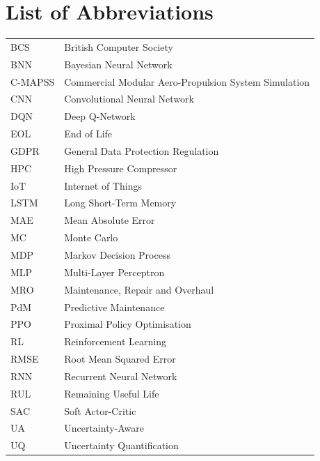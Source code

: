 \documentclass[12pt,a4paper]{report}
\begin{document}
\newpage

\tableofcontents
\newpage
\listoffigures
{}
\newpage
\listoftables
{}
\newpage

\chapter*{List of Abbreviations}

\begin{tabular}{@{}ll@{}}
BCS     & British Computer Society \\
BNN     & Bayesian Neural Network \\
C-MAPSS & Commercial Modular Aero-Propulsion System Simulation \\
CNN     & Convolutional Neural Network \\
DQN     & Deep Q-Network \\
EOL     & End of Life \\
GDPR    & General Data Protection Regulation \\
HPC     & High Pressure Compressor \\
IoT     & Internet of Things \\
LSTM    & Long Short-Term Memory \\
MAE     & Mean Absolute Error \\
MC      & Monte Carlo \\
MDP     & Markov Decision Process \\
MLP     & Multi-Layer Perceptron \\
MRO     & Maintenance, Repair and Overhaul \\
PdM     & Predictive Maintenance \\
PPO     & Proximal Policy Optimisation \\
RL      & Reinforcement Learning \\
RMSE    & Root Mean Squared Error \\
RNN     & Recurrent Neural Network \\
RUL     & Remaining Useful Life \\
SAC     & Soft Actor-Critic \\
UA      & Uncertainty-Aware \\
UQ      & Uncertainty Quantification \\
\end{tabular}
\end{document}
